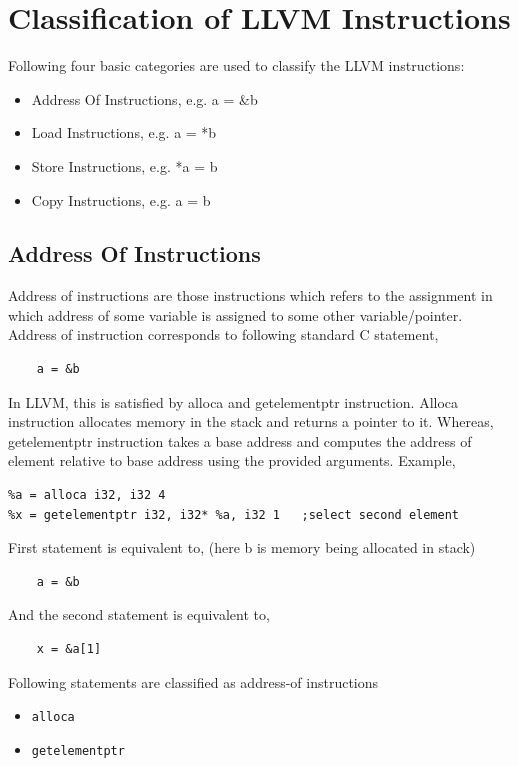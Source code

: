 \documentclass[a4paper,12pt]{report}
\begin{document}
\section{Classification of LLVM Instructions}
Following four basic categories are used to classify the LLVM instructions:

\begin{itemize}
    \item Address Of Instructions, e.g. a = \&b
    \item Load Instructions, e.g.  a = *b
    \item Store Instructions, e.g. *a = b
    \item Copy Instructions, e.g. a = b
\end{itemize}

\subsection{Address Of Instructions}
Address of instructions are those instructions which refers to the assignment 
in which address of some variable is assigned to some other variable/pointer.
Address of instruction corresponds to following standard C statement,
    
\begin{lstlisting}
    a = &b
\end{lstlisting}

In LLVM, this is satisfied by alloca and getelementptr instruction.
Alloca instruction allocates memory in the stack and returns a pointer to it.
Whereas, getelementptr instruction takes a base address and computes the address
of element relative to base address using the provided arguments.
Example,

\begin{verbatim}
%a = alloca i32, i32 4
%x = getelementptr i32, i32* %a, i32 1   ;select second element                 
\end{verbatim}

\noindent
First statement is equivalent to, (here b is memory being allocated in stack)

\begin{lstlisting}
    a = &b
\end{lstlisting}

\noindent
And the second statement is equivalent to,
\begin{lstlisting}
    x = &a[1]
\end{lstlisting}

\noindent
Following statements are classified as address-of instructions
\begin{itemize}
    \item \texttt{alloca}
    \item \texttt{getelementptr}
\end{itemize}
\end{document}
